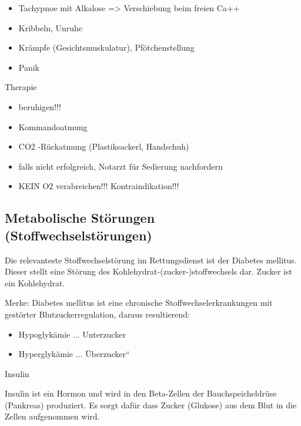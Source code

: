 \documentclass{article}
\begin{document}
\begin{itemize}
\item Tachypnoe mit Alkalose ={\textgreater} Verschiebung  beim freien
Ca++

\item Kribbeln, Unruhe

\item Kr\"ampfe (Gesichtsmuskulatur),  Pf\"otchenstellung

\item Panik

\end{itemize}
Therapie

\begin{itemize}
\item beruhigen!!!

\item Kommandoatmung

\item CO2 {}-R\"uckatmung  (Plastiksackerl,  Handschuh)

\item falls nicht erfolgreich, Notarzt f\"ur Sedierung  nachfordern

\item KEIN O2  verabreichen!!! Kontraindikation!!!

\end{itemize}
\subsection{Metabolische St\"orungen (Stoffwechselst\"orungen)}
Die relevanteste Stoffwechselst\"orung im Rettungsdienst ist der
Diabetes mellitus. Dieser stellt eine
St\"orung des Kohlehydrat-(zucker-)stoffwechsels dar. Zucker ist ein
Kohlehydrat. 

Merke: Diabetes mellitus ist eine chronische Stoffwechselerkrankungen
mit  gest\"orter Blutzuckerregulation, daraus  resultierend:

\begin{itemize}
\item Hypoglyk\"amie ... Unterzucker

\item Hyperglyk\"amie ... {\quotedblbase}\"Uberzucker{\textquotedblleft}

\end{itemize}
Insulin 

Insulin ist ein Hormon und wird in den Beta-Zellen der
Bauchspeicheldr\"use (Pankreas) produziert. Es sorgt daf\"ur dass
Zucker (Glukose) aus dem Blut in die Zellen aufgenommen wird. 
\end{document}
